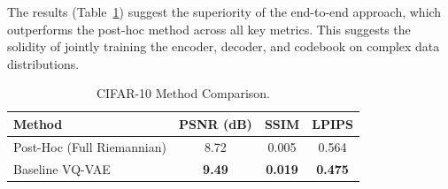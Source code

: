 \documentclass{article}
\begin{document}
The results (Table~\ref{tab:cifar10_results}) suggest the superiority of the end-to-end approach, which outperforms the post-hoc method across all key metrics.
This suggests the solidity of jointly training the encoder, decoder, and codebook on complex data distributions.

\begin{table}[h!]
\caption{CIFAR-10 Method Comparison.\protect\footnotemark}
\label{tab:cifar10_results}
\begin{center}
\begin{footnotesize}
\begin{tabular}{l c c c}
\toprule
Method & PSNR (dB) & SSIM & LPIPS \\
\midrule
Post-Hoc (Full Riemannian) & 8.72 & 0.005 & 0.564 \\
Baseline VQ-VAE & \textbf{9.49} & \textbf{0.019} & \textbf{0.475} \\
\bottomrule
\end{tabular}
\end{footnotesize}
\end{center}
\vspace{-0.4cm}
\end{table}
\end{document}
